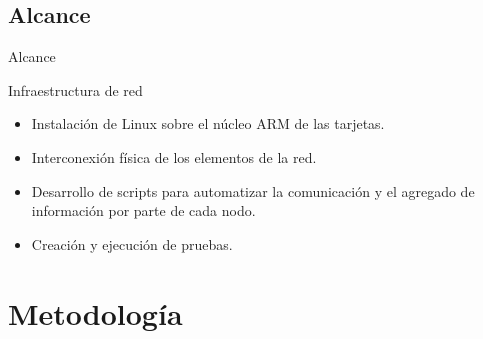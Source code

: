 \documentclass[aspectratio=169]{beamer}
\begin{document}
\subsection{Alcance}
\begin{frame}{Alcance}
\begin{block}{Infraestructura de red}
	\begin{itemize}
		\item Instalación de Linux sobre el núcleo ARM de las tarjetas.
		\item Interconexión física de los elementos de la red.
		\item Desarrollo de scripts para automatizar la comunicación y el agregado de información por parte de cada nodo.
		\item Creación y ejecución de pruebas.
	\end{itemize}
\end{block}
\end{frame}

\section{Metodología}
\end{document}
